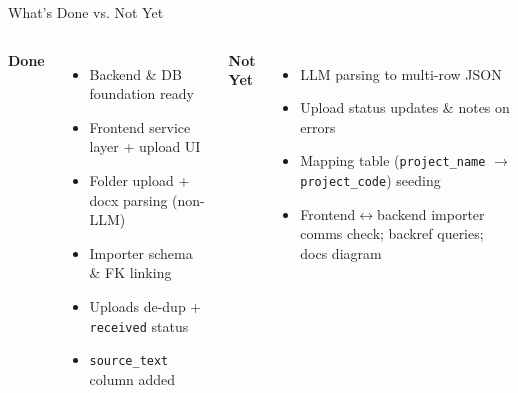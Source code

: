 \documentclass [aspectratio=169]{beamer}
\begin{document}
\begin{frame}{What’s Done vs. Not Yet}
\begin{columns}[t,onlytextwidth]
\textbf{Done}
\begin{itemize}
    \item Backend \& DB foundation ready
    \item Frontend service layer + upload UI
    \item Folder upload + docx parsing (non-LLM)
    \item Importer schema \& FK linking
    \item Uploads de-dup + \texttt{received} status
    \item \texttt{source\_text} column added
\end{itemize}

\textbf{Not Yet}
\begin{itemize}
    \item LLM parsing to multi-row JSON
    \item Upload status updates \& notes on errors
    \item Mapping table (\texttt{project\_name} $\rightarrow$ \texttt{project\_code}) seeding
    \item Frontend$\leftrightarrow$backend importer comms check; backref queries; docs diagram
\end{itemize}
\end{columns}
\end{frame}
\end{document}
